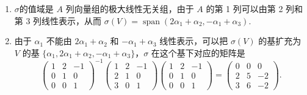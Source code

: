 \documentclass[12pt,fontset=fandol]{ctexart}
\begin{document}
\begin{solve}
\begin{enumerate}
        \item  $\sigma$的值域是 $A$ 列向量组的极大线性无关组，由于 $ A $ 的第 1 列可以由第 2 列和第 3 列线性表示，从而 $\sigma(V)=\operatorname{span}(2 \alpha_{1}+\alpha_{2}, -\alpha_{1}+\alpha_{3})$.

        \item 由于 $\alpha_{1}$ 不能由 $2 \alpha_{1}+\alpha_{2}$ 和 $-\alpha_{1}+\alpha_{3}$ 线性表示，可以把 $\sigma(V)$ 的基扩充为 $V$ 的基 $\{\alpha_{1}, 2 \alpha_{1}+\alpha_{2}, -\alpha_{1}+\alpha_{3}\}$，$\sigma$ 在这个基下对应的矩阵是
              \[\begin{pmatrix}
                      1 & 2 & -1 \\
                      0 & 1 & 0  \\
                      0 & 0 & 1
                  \end{pmatrix}^{-1}\begin{pmatrix}
                      1 & 2 & -1 \\
                      2 & 1 & 0  \\
                      3 & 0 & 1
                  \end{pmatrix}\begin{pmatrix}
                      1 & 2 & -1 \\
                      0 & 1 & 0  \\
                      0 & 0 & 1
                  \end{pmatrix}=\begin{pmatrix}
                      0 & 0 & 0  \\
                      2 & 5 & -2 \\
                      3 & 6 & -2
                  \end{pmatrix}.\]


\end{enumerate}
\end{solve}
\end{document}
